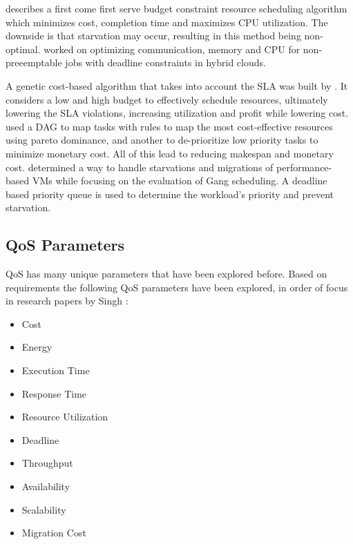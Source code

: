 \documentclass[fullapage,12pt]{article}
\begin{document}
\textcite{ana2010} describes a first come first serve budget constraint resource scheduling algorithm which minimizes cost, completion time and maximizes CPU utilization. The downside is that starvation may occur, resulting in this  method being non-optimal.
\textcite{van2010cost} worked on optimizing communication, memory and CPU for non-preeemptable jobs with deadline constraints in hybrid clouds.

A genetic cost-based algorithm that takes into account the SLA was built by \textcite{liu2013cost}. It considers a low and high budget to effectively schedule resources, ultimately lowering the SLA violations, increasing utilization and profit while lowering cost.
\textcite{su2013cost} used a DAG to map tasks with rules to map the most cost-effective resources using pareto dominance, and another to de-prioritize low priority tasks to minimize monetary cost. All of this lead to reducing makespan and monetary cost.
\textcite{ioannis2011cost} determined a way to handle starvations and migrations of performance-based VMs while focusing on the evaluation of Gang scheduling. A deadline based priority queue is used to determine the workload's priority and prevent starvation.



\subsection{QoS Parameters} \label{sub:schedQosParams}

QoS has many unique parameters that have been explored before. Based on requirements the following QoS parameters have been explored, in order of focus in research papers by Singh \cite{Singh2016}:
\begin{itemize}
    \item Cost
    \item Energy
    \item Execution Time
    \item Response Time
    \item Resource Utilization
    \item Deadline
    \item Throughput
    \item Availability
    \item Scalability
    \item Migration Cost
\end{itemize}
\end{document}
